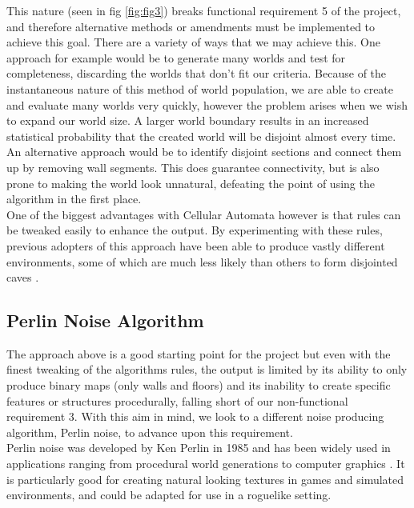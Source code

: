\documentclass[12pt,a4paper]{article}
\begin{document}
This nature (seen in fig \ref{fig:fig3}) breaks functional requirement 5 of the project, and therefore alternative methods or amendments must be implemented to achieve this goal. There are a variety of ways that we may achieve this. One approach for example would be to generate many worlds and test for completeness, discarding the worlds that don't fit our criteria. Because of the instantaneous nature of this method of world population, we are able to create and evaluate many worlds very quickly, however the problem arises when we wish to expand our world size. A larger world boundary results in an increased statistical probability that the created world will be disjoint almost every time. An alternative approach would be to identify disjoint sections and connect them up by removing wall segments. This does guarantee connectivity, but is also prone to making the world look unnatural, defeating the point of using the algorithm in the first place. \\

One of the biggest advantages with Cellular Automata however is that rules can be tweaked easily to enhance the output. By experimenting with these rules, previous adopters of this approach have been able to produce vastly different environments, some of which are much less likely than others to form disjointed caves \cite{roguebasin}. \\




\subsection{Perlin Noise Algorithm}


The approach above is a good starting point for the project but even with the finest tweaking of the algorithms rules, the output is limited by its ability to only produce binary maps (only walls and floors) and its inability to create specific features or structures procedurally, falling short of our non-functional requirement 3. With this aim in mind, we look to a different noise producing algorithm, Perlin noise, to advance upon this requirement. \\


Perlin noise was developed by Ken Perlin in 1985 and has been widely used in applications ranging from procedural world generations to computer graphics \cite{imagesynth} \cite{surveyPNF}. It is particularly good for creating natural looking textures in games and simulated environments, and could be adapted for use in a roguelike setting.\\
\end{document}
